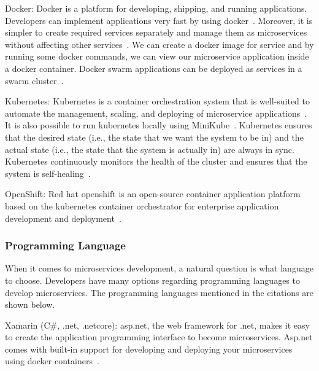 \par Docker: Docker is a platform for developing, shipping, and running applications. Developers can implement applications very fast by using docker~\cite{Sharaf2019, Kristiani2020, khan2020}. Moreover, it is simpler to create required services separately and manage them as microservices without affecting other services~\cite{leo2019, Hou2020, Kalske2017, Bahadori2018}. We can create a docker image for service and by running some docker commands, we can view our microservice application inside a docker container. Docker swarm applications can be deployed as services in a swarm cluster~\cite{Falatiuk2019, Venugopal2017, coulson2020}.
	
\par Kubernetes: Kubernetes is a container orchestration system that is well-suited to automate the management, scaling, and deploying of microservice applications~\cite{Zaytev2018, Kristiani2020, khan2020}. 
It is also possible to run kubernetes locally using MiniKube~\cite{leo2019, Kalske2017}.
Kubernetes ensures that the desired state (i.e., the state that we want the system to be in) and the actual state (i.e., the state that the system is actually in) are always in sync. Kubernetes continuously monitors the health of the cluster and ensures that the system is self-healing~\cite{Bahadori2018, Falatiuk2019, Venugopal2017}.

\par OpenShift: Red hat openshift is an open-source container application platform based on the kubernetes container orchestrator for enterprise application development and deployment~\cite{Johansson2019, Bahadori2018}.


\subsubsection{Programming Language}
When it comes to microservices development, a natural question is what language to choose. Developers have many options regarding programming languages to develop microservices. The programming languages mentioned in the citations are shown below.

\par Xamarin (C\#, .net, .netcore): asp.net, the web framework for .net, makes it easy to create the application programming interface to become microservices. Asp.net comes with built-in support for developing and deploying your microservices using docker containers~\cite{liu2018, chauvel2018, haugeland2020, Johansson2019, neves2019, Falatiuk2019}.

